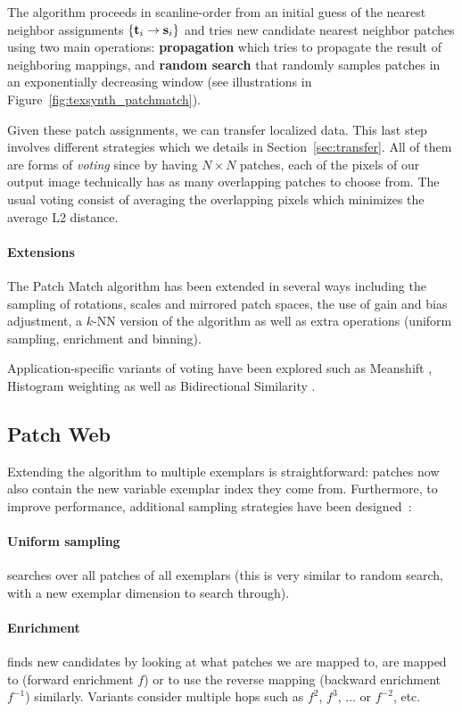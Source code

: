 The algorithm proceeds in scanline-order from an initial guess of the nearest neighbor assignments $\{\mathbf{t}_i \to \mathbf{s}_i\}$ and tries new candidate nearest neighbor patches using two main operations:
\textbf{propagation} which tries to propagate the result of neighboring mappings, and 
\textbf{random search} that randomly samples patches in an exponentially decreasing window (see illustrations in Figure~\ref{fig:texsynth_patchmatch}).

Given these patch assignments, we can transfer localized data.
This last step involves different strategies which we details in Section~\ref{sec:transfer}. 
All of them are forms of \emph{voting} since by having $N\times N$ patches, each of the pixels of our output image technically has as many overlapping patches to choose from.
The usual voting consist of averaging the overlapping pixels which minimizes the average L2 distance.

\paragraph{Extensions}
The Patch Match algorithm has been extended in several ways \cite{Barnes10} including the sampling of rotations, scales and mirrored patch spaces, the use of gain and bias adjustment, a $k$-NN version of the algorithm as well as extra operations (uniform sampling, enrichment and binning).

Application-specific variants of voting have been explored such as Meanshift \cite{Wexler07}, Histogram weighting \cite{Kopf07} as well as Bidirectional Similarity \cite{Simakov08}.

\subsection{Patch Web}
Extending the algorithm to multiple exemplars is straightforward: patches now also contain the new variable exemplar index they come from.
Furthermore, to improve performance, additional sampling strategies have been designed~\cite{Barnes11}:

\paragraph{Uniform sampling} searches over all patches of all exemplars (this is very similar to random search, with a new exemplar dimension to search through).

\paragraph{Enrichment} finds new candidates by looking at what patches we are mapped to, are mapped to (forward enrichment $f$) or to use the reverse mapping (backward enrichment $f^{-1}$) similarly.
Variants consider multiple hops such as $f^2$, $f^3$, $\dots$ or $f^{-2}$, etc.

